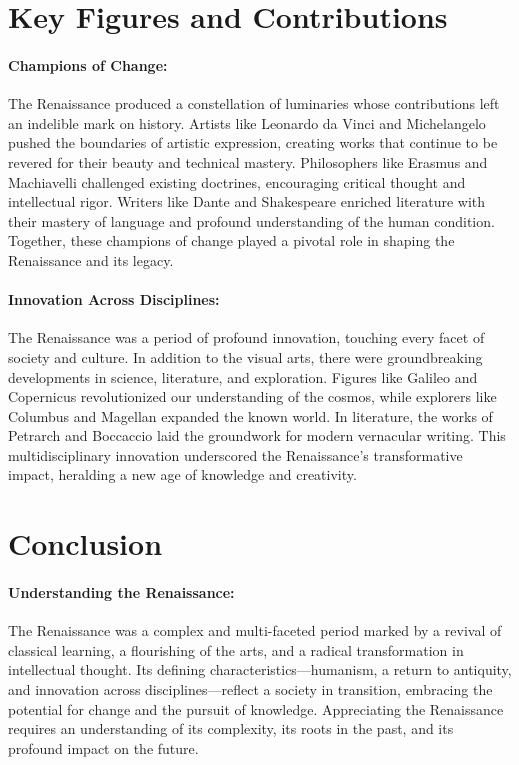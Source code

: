 \documentclass{book}
\begin{document}
\section*{Key Figures and Contributions}

\paragraph{Champions of Change:}
The Renaissance produced a constellation of luminaries whose contributions left an indelible mark on history. Artists like Leonardo da Vinci and Michelangelo pushed the boundaries of artistic expression, creating works that continue to be revered for their beauty and technical mastery. Philosophers like Erasmus and Machiavelli challenged existing doctrines, encouraging critical thought and intellectual rigor. Writers like Dante and Shakespeare enriched literature with their mastery of language and profound understanding of the human condition. Together, these champions of change played a pivotal role in shaping the Renaissance and its legacy.

\paragraph{Innovation Across Disciplines:}
The Renaissance was a period of profound innovation, touching every facet of society and culture. In addition to the visual arts, there were groundbreaking developments in science, literature, and exploration. Figures like Galileo and Copernicus revolutionized our understanding of the cosmos, while explorers like Columbus and Magellan expanded the known world. In literature, the works of Petrarch and Boccaccio laid the groundwork for modern vernacular writing. This multidisciplinary innovation underscored the Renaissance's transformative impact, heralding a new age of knowledge and creativity.

\section*{Conclusion}

\paragraph{Understanding the Renaissance:}
The Renaissance was a complex and multi-faceted period marked by a revival of classical learning, a flourishing of the arts, and a radical transformation in intellectual thought. Its defining characteristics—humanism, a return to antiquity, and innovation across disciplines—reflect a society in transition, embracing the potential for change and the pursuit of knowledge. Appreciating the Renaissance requires an understanding of its complexity, its roots in the past, and its profound impact on the future.
\end{document}
